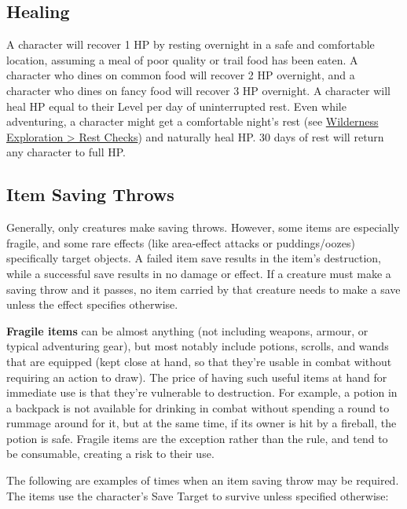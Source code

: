\documentclass{book}
\begin{document}
\subsection*{Healing}\label{healing}

A character will recover 1 HP by resting overnight in a safe and
comfortable location, assuming a meal of poor quality or trail food has
been eaten. A character who dines on common food will recover 2 HP
overnight, and a character who dines on fancy food will recover 3 HP
overnight. A character will heal HP equal to their Level per day of
uninterrupted rest. Even while adventuring, a character might get a
comfortable night's rest (see \hyperref[rest-checks]{Wilderness
Exploration \textgreater{} Rest Checks}) and naturally heal HP. 30 days
of rest will return any character to full HP.

\subsection*{Item Saving Throws}\label{item-saving-throws}

Generally, only creatures make saving throws. However, some items are
especially fragile, and some rare effects (like area-effect attacks or
puddings/oozes) specifically target objects. A failed item save results
in the item's destruction, while a successful save results in no damage
or effect. If a creature must make a saving throw and it passes, no item
carried by that creature needs to make a save unless the effect
specifies otherwise.

\textbf{Fragile items} can be almost anything (not including weapons,
armour, or typical adventuring gear), but most notably include potions,
scrolls, and wands that are equipped (kept close at hand, so that
they're usable in combat without requiring an action to draw). The price
of having such useful items at hand for immediate use is that they're
vulnerable to destruction. For example, a potion in a backpack is not
available for drinking in combat without spending a round to rummage
around for it, but at the same time, if its owner is hit by a fireball,
the potion is safe. Fragile items are the exception rather than the
rule, and tend to be consumable, creating a risk to their use.

The following are examples of times when an item saving throw may be
required. The items use the character's Save Target to survive unless
specified otherwise:
\end{document}
